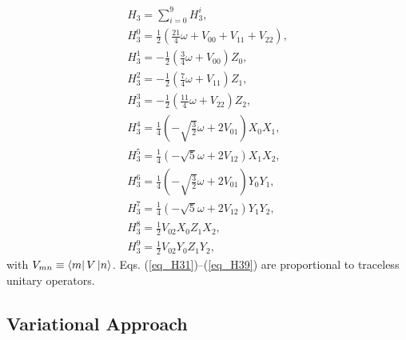 \documentclass[aps,10pt,superscriptaddress,floatfix,nofootinbib,notitlepage]{revtex4-1}
\begin{document}
\begin{gather}
    H_3
    =\sum_{i=0}^9
    H_3^{i}, \\
    H_3^{0}
    =\frac{1}{2}
    \left(
    \frac{21}{4}
    \omega
    +V_{00}
    +V_{11}
    +V_{22}
    \right), \\
    H_3^{1}
    =-\frac{1}{2}
    \left(
    \frac{3}{4}
    \omega
    +V_{00}
    \right)
    Z_0, \label{eq_H31} \\
    H_3^{2}
    =-\frac{1}{2}
    \left(
    \frac{7}{4}
    \omega
    +V_{11}
    \right)
    Z_1, \label{eq_H32} \\
    H_3^{3}
    =-\frac{1}{2}
    \left(
    \frac{11}{4}
    \omega
    +V_{22}
    \right)
    Z_2, \label{eq_H33} \\
    H_3^{4}
    =\frac{1}{4}
    \left(
    -\sqrt{\frac{3}{2}}
    \omega
    +2V_{01}
    \right)
    X_0X_1, \label{eq_H34} \\
    H_3^{5}
    =\frac{1}{4}
    \left(
    -\sqrt{5}
    \omega
    +2V_{12}
    \right)
    X_1X_2, \label{eq_H35} \\
    H_3^{6}
    =\frac{1}{4}
    \left(
    -\sqrt{\frac{3}{2}}
    \omega
    +2V_{01}
    \right)
    Y_0Y_1, \label{eq_H36} \\
    H_3^{7}
    =\frac{1}{4}
    \left(
    -\sqrt{5}
    \omega
    +2V_{12}
    \right)
    Y_1Y_2, \label{eq_H37} \\
    H_3^{8}
    =\frac{1}{2}
    V_{02}
    X_0Z_1X_2, \label{eq_H38} \\
    H_3^{9}
    =\frac{1}{2}
    V_{02}
    Y_0Z_1Y_2, \label{eq_H39}
\end{gather}
with $V_{mn}\equiv\bra{m}V\ket{n}$. Eqs. (\ref{eq_H31})--(\ref{eq_H39}) are proportional to traceless unitary operators.

\subsection{Variational Approach} 
\end{document}

